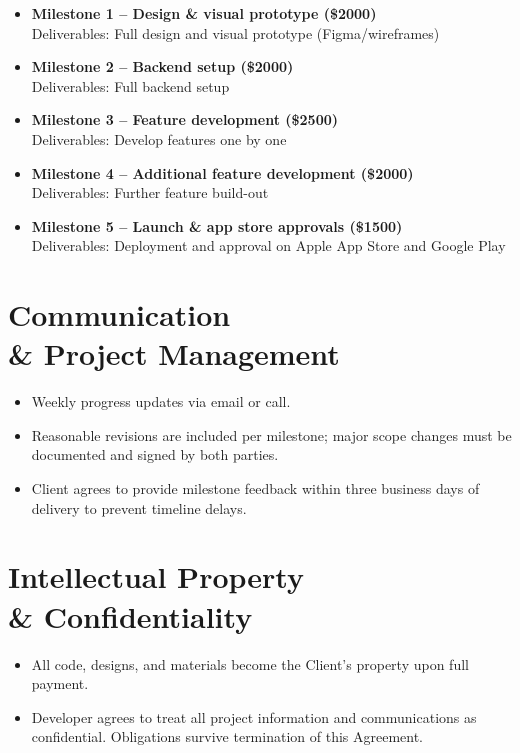 \documentclass[11pt,letterpaper]{article}
\newcommand{\MilestoneOne}{Design \& visual prototype}
\newcommand{\MOneCost}{2000}
\newcommand{\MOneDeliverables}{Full design and visual prototype (Figma/wireframes)}
\newcommand{\MilestoneTwo}{Backend setup}
\newcommand{\MTwoCost}{2000}
\newcommand{\MTwoDeliverables}{Full backend setup}
\newcommand{\MilestoneThree}{Feature development}
\newcommand{\MThreeCost}{2500}
\newcommand{\MThreeDeliverables}{Develop features one by one}
\newcommand{\MilestoneFour}{Additional feature development}
\newcommand{\MFourCost}{2000}
\newcommand{\MFourDeliverables}{Further feature build-out}
\newcommand{\MilestoneFive}{Launch \& app store approvals}
\newcommand{\MFiveCost}{1500}
\newcommand{\MFiveDeliverables}{Deployment and approval on Apple App Store and Google Play}
\begin{document}
\begin{itemize}[leftmargin=*]
\item \textbf{Milestone 1 -- \MilestoneOne{} (\$\MOneCost{})}\\
Deliverables: \MOneDeliverables{}

\item \textbf{Milestone 2 -- \MilestoneTwo{} (\$\MTwoCost{})}\\
Deliverables: \MTwoDeliverables{}

\item \textbf{Milestone 3 -- \MilestoneThree{} (\$\MThreeCost{})}\\
Deliverables: \MThreeDeliverables{}

\item \textbf{Milestone 4 -- \MilestoneFour{} (\$\MFourCost{})}\\
Deliverables: \MFourDeliverables{}

\item \textbf{Milestone 5 -- \MilestoneFive{} (\$\MFiveCost{})}\\
Deliverables: \MFiveDeliverables{}
\end{itemize}

\section{Communication \\& Project Management}
\begin{itemize}[leftmargin=*]
\item Weekly progress updates via email or call.
\item Reasonable revisions are included per milestone; major scope changes must be documented and signed by both parties.
\item Client agrees to provide milestone feedback within three business days of delivery to prevent timeline delays.
\end{itemize}

\section{Intellectual Property \\& Confidentiality}
\begin{itemize}[leftmargin=*]
\item All code, designs, and materials become the Client's property upon full payment.
\item Developer agrees to treat all project information and communications as confidential. Obligations survive termination of this Agreement.
\end{itemize}
\end{document}
